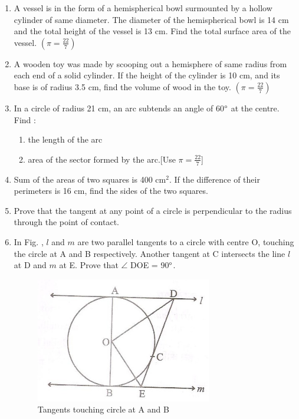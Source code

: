 \documentclass[10pt,-letter paper]{article}
\providecommand{\brak}[1]{\ensuremath{\left(#1\right)}}
\begin{document}
\begin{enumerate}
\item A vessel is in the form of a hemispherical bowl surmounted by a hollow cylinder of same diameter. The diameter of the hemispherical bowl is 14 cm and the total height of the vessel is 13 cm. Find the total surface area of the vessel. $\brak{ \pi = \frac{22}{7}}$
\item A wooden toy was made by scooping out a hemisphere of same radius from each end of a solid cylinder. If the height of the cylinder is 10 cm,  and its base is of radius 3.5 cm, find the volume of wood in the toy. $\brak{ \pi = \frac{22}{7}}$
\item In a circle of radius 21 cm, an arc subtends an angle of 60$\degree$ at the centre. Find :  \begin{enumerate} 
\item the length of the arc
\item area of the sector formed by the arc.[Use $\pi = \frac{22}{7}$]
\end{enumerate}
\item Sum of the areas of two squares is 400 cm$^2$. If the difference of their perimeters is 16 cm, find the sides of the two squares.

\item Prove that the tangent at any point of a circle is perpendicular to the radius through the point of contact.


\item In Fig. , $l$ and $m$ are two parallel tangents to a circle with centre O, touching the circle at A and B respectively. Another tangent at C intersects the line $l$ at D and $m$ at E. Prove that $\angle$ DOE = 90$\degree$.
\begin{figure}[H]
\centering
\includegraphics[width=\columnwidth]{5.png}
\caption{Tangents touching circle at A and B}
\label{fig:fig5}
 \end{figure}


\end{enumerate}
\end{document}
